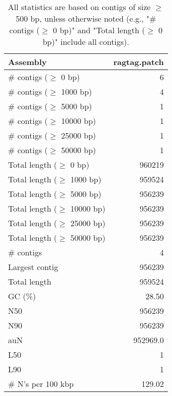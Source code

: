 \documentclass[12pt,a4paper]{article}
\begin{document}
\begin{table}[ht]
\begin{center}
\caption{All statistics are based on contigs of size $\geq$ 500 bp, unless otherwise noted (e.g., "\# contigs ($\geq$ 0 bp)" and "Total length ($\geq$ 0 bp)" include all contigs).}
\begin{tabular}{|l*{1}{|r}|}
\hline
Assembly & ragtag.patch \\ \hline
\# contigs ($\geq$ 0 bp) & 6 \\ \hline
\# contigs ($\geq$ 1000 bp) & 4 \\ \hline
\# contigs ($\geq$ 5000 bp) & 1 \\ \hline
\# contigs ($\geq$ 10000 bp) & 1 \\ \hline
\# contigs ($\geq$ 25000 bp) & 1 \\ \hline
\# contigs ($\geq$ 50000 bp) & 1 \\ \hline
Total length ($\geq$ 0 bp) & 960219 \\ \hline
Total length ($\geq$ 1000 bp) & 959524 \\ \hline
Total length ($\geq$ 5000 bp) & 956239 \\ \hline
Total length ($\geq$ 10000 bp) & 956239 \\ \hline
Total length ($\geq$ 25000 bp) & 956239 \\ \hline
Total length ($\geq$ 50000 bp) & 956239 \\ \hline
\# contigs & 4 \\ \hline
Largest contig & 956239 \\ \hline
Total length & 959524 \\ \hline
GC (\%) & 28.50 \\ \hline
N50 & 956239 \\ \hline
N90 & 956239 \\ \hline
auN & 952969.0 \\ \hline
L50 & 1 \\ \hline
L90 & 1 \\ \hline
\# N's per 100 kbp & 129.02 \\ \hline
\end{tabular}
\end{center}
\end{table}
\end{document}
